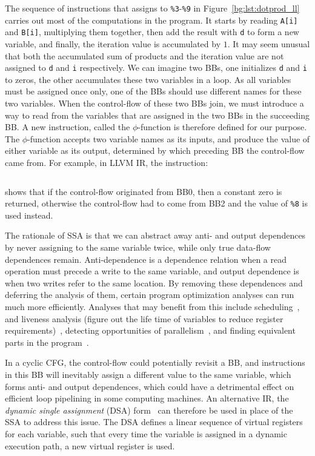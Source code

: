 The sequence of instructions that assigns to \verb|%3|-\verb|%9| in
Figure~\ref{bg:lst:dotprod_ll} carries out most of the computations in the
program.  It starts by reading \verb|A[i]| and \verb|B[i]|, multiplying them
together, then add the result with \verb|d| to form a new variable, and
finally, the iteration value is accumulated by $1$.  It may seem unusual that
both the accumulated sum of products and the iteration value are not assigned
to \verb|d| and \verb|i| respectively.  We can imagine two BBs, one initializes
\verb|d| and \verb|i| to zeros, the other accumulates these two variables in
a loop.  As all variables must be assigned once only, one of the BBs should
use different names for these two variables.  When the control-flow of these
two BBs join, we must introduce a way to read from the variables that are
assigned in the two BBs in the succeeding BB\@.  A new instruction, called the
$\phi$-function is therefore defined for our purpose.  The $\phi$-function
accepts two variable names as its inputs, and produce the value of either
variable as its output, determined by which preceding BB the control-flow came
from.  For example, in LLVM IR, the instruction:
\begin{lstlisting}[language=LLVM, basicstyle=\tt]
    %d.01 = phi float [ 0.000000e+00, %0 ], [ %8, %2 ]
\end{lstlisting}\vspace{-16.5pt}
shows that if the control-flow originated from BB0, then a constant zero is
returned, otherwise the control-flow had to come from BB2 and the value of
\verb|%8| is used instead.

The rationale of SSA is that we can abstract away anti- and output dependences
by never assigning to the same variable twice, while only true data-flow
dependences remain.  Anti-dependence is a dependence relation when a read
operation must precede a write to the same variable, and output dependence is
when two writes refer to the same location.  By removing these dependences
and deferring the analysis of them, certain program optimization analyses
can run much more efficiently.  Analyses that may benefit from this include
scheduling~\cite{rau94}, and liveness analysis (figure out the life time
of variables to reduce register requirements)~\cite{cytron91}, detecting
opportunities of parallelism~\cite{cytron87}, and finding equivalent parts in
the program~\cite{alpern88}.

In a cyclic CFG, the control-flow could potentially revisit a BB, and
instructions in this BB will inevitably assign a different value to the
same variable, which forms anti- and output dependences, which could have a
detrimental effect on efficient loop pipelining in some computing machines.  An
alternative IR, the \emph{dynamic single assignment} (DSA) form~\cite{rau92}
can therefore be used in place of the SSA to address this issue.  The DSA
defines a linear sequence of virtual registers for each variable, such that
every time the variable is assigned in a dynamic execution path, a new virtual
register is used.


